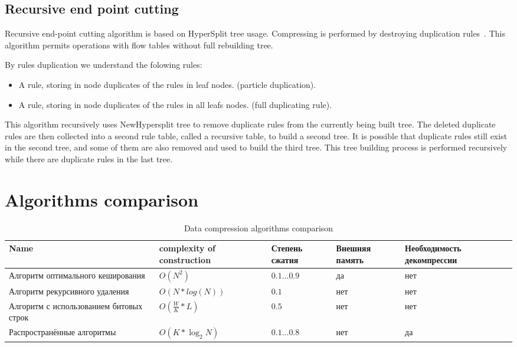 \documentclass[conference]{IEEEtran}
\begin{document}
        \subsection{Recursive end point cutting}
            Recursive end-point cutting algorithm is based on HyperSplit tree usage. Compressing is performed by destroying duplication rules~\cite{chang2019fast}.
            This algorithm permits operations with flow tables without full rebuilding tree.

            By rules duplication we understand the folowing rules:
            \begin{itemize}
                \item A rule, storing in node duplicates of the rules in leaf nodes. (particle duplication).
                \item A rule, storing in node duplicates of the rules in all leafs nodes. (full duplicating rule).
            \end{itemize}
        
            This algorithm recursively uses NewHypersplit tree to remove duplicate rules from the currently being built tree. 
            The deleted duplicate rules are then collected into a second rule table, called a recursive table, to build a second tree. 
            It is possible that duplicate rules still exist in the second tree, and some of them are also removed 
            and used to build the third tree. 
            This tree building process is performed recursively while there are duplicate rules in the last tree.
        \section {Algorithms comparison}
       \begin{table*}[!t]
           \centering
            \caption{Data compression algorithms comparison}\label{tab:tab1}
            \begin{tabular}{|m{3.5cm}|m{2.5cm}|m{2cm}|m{3.5cm}|m{4cm}|}
                \hline
                \bf Name & \bf complexity of construction  & \bf Степень сжатия & \bf Внешняя память & \bf Необходимость декомпрессии \\
                \hline
                Алгоритм оптимального кеширования & $O(N^2)$ & \(0.1 \ldots 0.9\) & да & нет \\
                \hline
                Алгоритм рекурсивного удаления & $O(N*log(N))$ & \(0.1\) & нет & нет \\
                \hline
                Алгоритм с использованием битовых строк & $O(\frac{W}{K}*L)$ & \(0.5\) & нет & нет \\
                \hline
                Распространённые алгоритмы & $O(K*\log_2{N})$ & \(0.1 \ldots 0.8\) & нет & да \\
                \hline
            \end{tabular}
        \end{table*}
        
\end{document}
